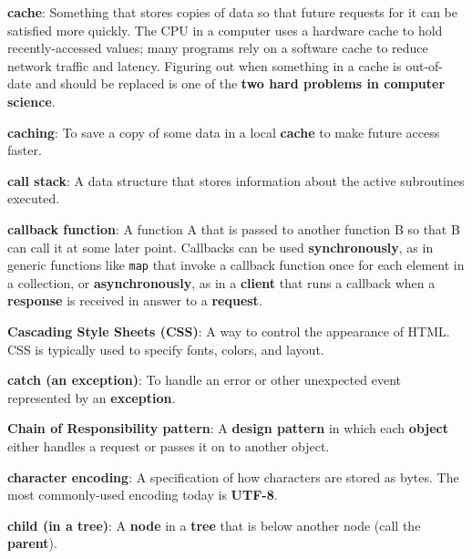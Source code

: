 \documentclass[krantzl]{krantz}
\newcommand{\glosskey}[1]{\textbf{#1}}
\begin{document}
\noindent \textbf{{\newline}\glosskey{cache}}: 
Something that stores copies of data so that future requests for it can be satisfied more quickly. The CPU in a computer uses a hardware cache to hold recently-accessed values; many programs rely on a software cache to reduce network traffic and latency. Figuring out when something in a cache is out-of-date and should be replaced is one of the \glosskey{two hard problems in computer science}.


\noindent \textbf{{\newline}\glosskey{caching}}: 
To save a copy of some data in a local \glosskey{cache} to make future access faster.


\noindent \textbf{{\newline}\glosskey{call stack}}: 
A data structure that stores information about the active subroutines executed.


\noindent \textbf{{\newline}\glosskey{callback function}}: 
A function A that is passed to another function B so that B can call it at some later point. Callbacks can be used \glosskey{synchronously}, as in generic functions like \texttt{map} that invoke a callback function once for each element in a collection, or \glosskey{asynchronously}, as in a \glosskey{client} that runs a callback when a \glosskey{response} is received in answer to a \glosskey{request}.


\noindent \textbf{{\newline}\glosskey{Cascading Style Sheets} (CSS)}: 
A way to control the appearance of HTML. CSS is typically used to specify fonts, colors, and layout.


\noindent \textbf{{\newline}\glosskey{catch (an exception)}}: 
To handle an error or other unexpected event represented by an \glosskey{exception}.


\noindent \textbf{{\newline}\glosskey{Chain of Responsibility pattern}}: 
A \glosskey{design pattern} in which each \glosskey{object} either handles a request or passes it on to another object.


\noindent \textbf{{\newline}\glosskey{character encoding}}: 
A specification of how characters are stored as bytes. The most commonly-used encoding today is \glosskey{UTF-8}.


\noindent \textbf{{\newline}\glosskey{child (in a tree)}}: 
A \glosskey{node} in a \glosskey{tree} that is below another node (call the \glosskey{parent}).
\end{document}
